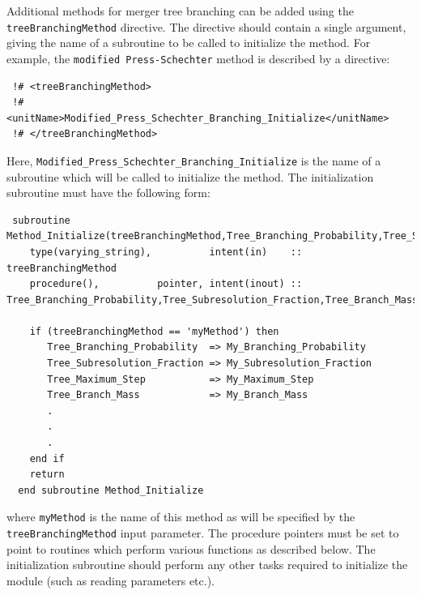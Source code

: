 Additional methods for merger tree branching can be added using the {\tt treeBranchingMethod} directive. The directive should contain a single argument, giving the name of a subroutine to be called to initialize the method. For example, the {\tt modified Press-Schechter} method is described by a directive:
\begin{verbatim}
 !# <treeBranchingMethod>
 !#  <unitName>Modified_Press_Schechter_Branching_Initialize</unitName>
 !# </treeBranchingMethod>
\end{verbatim}
Here, {\tt Modified\_Press\_Schechter\_Branching\_Initialize} is the name of a subroutine which will be called to initialize the method. The initialization subroutine must have the following form:
\begin{verbatim}
 subroutine Method_Initialize(treeBranchingMethod,Tree_Branching_Probability,Tree_Subresolution_Fraction,Tree_Branch_Mass,Tree_Maximum_Step)
    type(varying_string),          intent(in)    :: treeBranchingMethod
    procedure(),          pointer, intent(inout) :: Tree_Branching_Probability,Tree_Subresolution_Fraction,Tree_Branch_Mass,Tree_Maximum_Step
    
    if (treeBranchingMethod == 'myMethod') then
       Tree_Branching_Probability  => My_Branching_Probability
       Tree_Subresolution_Fraction => My_Subresolution_Fraction
       Tree_Maximum_Step           => My_Maximum_Step
       Tree_Branch_Mass            => My_Branch_Mass
       .
       .
       .
    end if
    return
  end subroutine Method_Initialize
\end{verbatim}
where {\tt myMethod} is the name of this method as will be specified by the {\tt treeBranchingMethod} input parameter. The procedure pointers must be set to point to routines which perform various functions as described below. The initialization subroutine should perform any other tasks required to initialize the module (such as reading parameters etc.).

